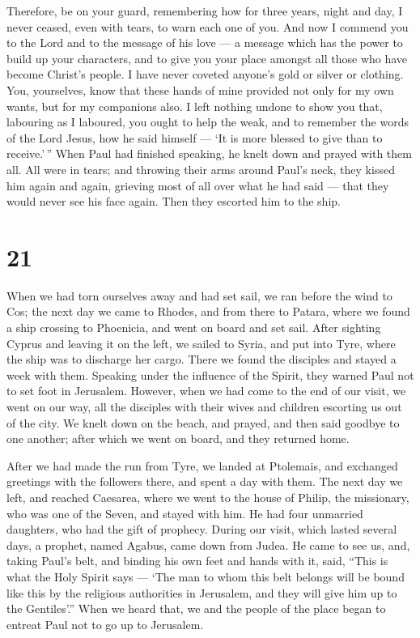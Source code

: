  Therefore, be on your guard, remembering how for three
years, night and day, I never ceased, even with tears, to warn each one
of you.  And now I commend you to the Lord and to the
message of his love --- a message which has the power to build up your
characters, and to give you your place amongst all those who have become
Christ's people.  I have never coveted anyone's gold or
silver or clothing.  You, yourselves, know that these hands
of mine provided not only for my own wants, but for my companions also.
 I left nothing undone to show you that, labouring as I
laboured, you ought to help the weak, and to remember the words of the
Lord Jesus, how he said himself --- `It is more blessed to give than to
receive.'\,''  When Paul had finished speaking, he knelt
down and prayed with them all.  All were in tears; and
throwing their arms around Paul's neck, they kissed him again and again,
 grieving most of all over what he had said --- that they
would never see his face again. Then they escorted him to the ship.

\hypertarget{section-20}{%
\section{21}\label{section-20}}

 When we had torn ourselves away and had set sail, we ran
before the wind to Cos; the next day we came to Rhodes, and from there
to Patara,  where we found a ship crossing to Phoenicia, and
went on board and set sail.  After sighting Cyprus and
leaving it on the left, we sailed to Syria, and put into Tyre, where the
ship was to discharge her cargo.  There we found the
disciples and stayed a week with them. Speaking under the influence of
the Spirit, they warned Paul not to set foot in Jerusalem. 
However, when we had come to the end of our visit, we went on our way,
all the disciples with their wives and children escorting us out of the
city. We knelt down on the beach, and prayed,  and then said
goodbye to one another; after which we went on board, and they returned
home.

 After we had made the run from Tyre, we landed at
Ptolemais, and exchanged greetings with the followers there, and spent a
day with them.  The next day we left, and reached Caesarea,
where we went to the house of Philip, the missionary, who was one of the
Seven, and stayed with him.  He had four unmarried
daughters, who had the gift of prophecy.  During our visit,
which lasted several days, a prophet, named Agabus, came down from
Judea.  He came to see us, and, taking Paul's belt, and
binding his own feet and hands with it, said, ``This is what the Holy
Spirit says --- `The man to whom this belt belongs will be bound like
this by the religious authorities in Jerusalem, and they will give him
up to the Gentiles'.''  When we heard that, we and the
people of the place began to entreat Paul not to go up to Jerusalem.


